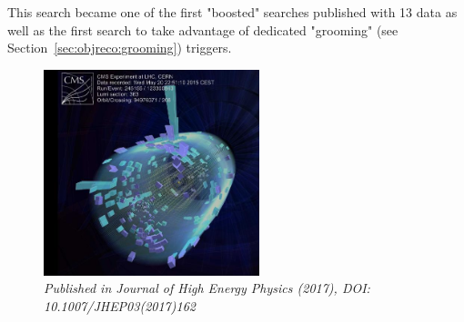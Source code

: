 \begin{centering}
{This search became one of the first "boosted" searches published with 13 \TeV data as well as the first search to take advantage of dedicated "grooming" (see Section~\ref{sec:objreco:grooming}) triggers.
}
\begin{figure}[b!] 
    \centering
    \includegraphics[height=6cm]{figures/analysis/search1/misc/first_coll.png}
    \vspace*{10mm}
    \caption*{\footnotesize{\textit{Published in Journal of High Energy Physics (2017), DOI: 10.1007/JHEP03(2017)162}}}
\end{figure}
\end{centering}

\clearpage

\clearpage


